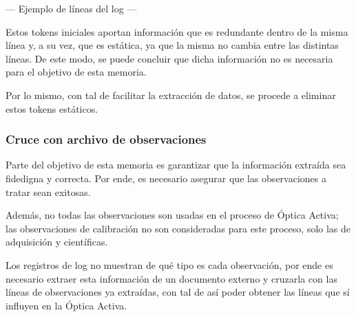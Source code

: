 --- Ejemplo de líneas del log ---

Estos tokens iniciales aportan información que es redundante dentro de la misma línea y, a su vez, que es estática, ya que la misma no cambia entre las distintas líneas. De este modo, se puede concluir que dicha información no es necesaria para el objetivo de esta memoria.

Por lo mismo, con tal de facilitar la extracción de datos, se procede a eliminar estos tokens estáticos.

\subsubsection{Cruce con archivo de observaciones}

Parte del objetivo de esta memoria es garantizar que la información extraída sea fidedigna y correcta. Por ende, es necesario asegurar que las observaciones a tratar sean exitosas.

Además, no todas las observaciones son usadas en el proceso de Óptica Activa; las observaciones de calibración no son consideradas para este proceso, solo las de adquisición y científicas.

Los registros de log no muestran de qué tipo es cada observación, por ende es necesario extraer esta información de un documento externo y cruzarla con las líneas de observaciones ya extraídas, con tal de así poder obtener las líneas que sí influyen en la Óptica Activa.

